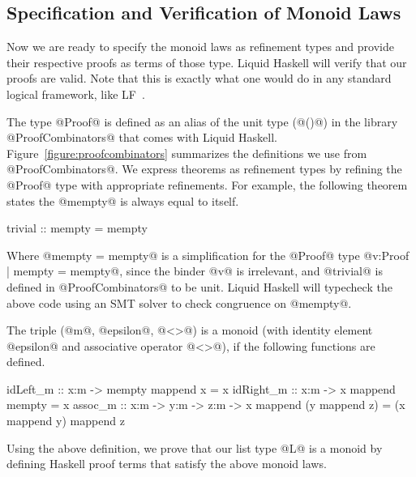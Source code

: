 \subsection{Specification and Verification of Monoid Laws}

Now we are ready to specify the monoid laws as refinement types and
provide their respective proofs as terms of those type. Liquid Haskell
will verify that our proofs are valid. 
%
Note that this is exactly what
one would do in any standard logical framework,
like LF~\cite{Harper93}.

The type @Proof@ is defined as an alias of the unit type (@()@)
in the library @ProofCombinators@ that comes with Liquid Haskell.
Figure~\ref{figure:proofcombinators} summarizes the definitions we use from @ProofCombinators@.
%
We express theorems as refinement types by refining
the @Proof@ type with appropriate refinements.
%
For example, the following theorem states
the @mempty@ is always equal to itself.
\begin{code}
trivial :: {mempty = mempty}
\end{code}
%
Where @{mempty = mempty}@ is a simplification for the @Proof@ type
@{v:Proof | mempty = mempty}@, since the binder @v@ is irrelevant, and
@trivial@ is defined in @ProofCombinators@ to be unit.
%
Liquid Haskell will typecheck the above code using an SMT
solver to check congruence on @mempty@.
%

\begin{definition}[Monoid] \label{definition:monoid}
The triple (@m@, @epsilon@, @<>@) is a monoid
(with identity element @epsilon@ and associative operator @<>@),
if the following functions are defined. %
%
\begin{code}
idLeft_m :: x:m -> {mempty mappend x = x}
idRight_m :: x:m -> {x mappend mempty = x}
assoc_m :: x:m -> y:m -> z:m -> {x mappend (y mappend z) = (x mappend y) mappend z}
\end{code}
\end{definition}
%
Using the above definition, we prove that our list type @L@ is a monoid
by defining Haskell proof terms that satisfy the above monoid laws. 

